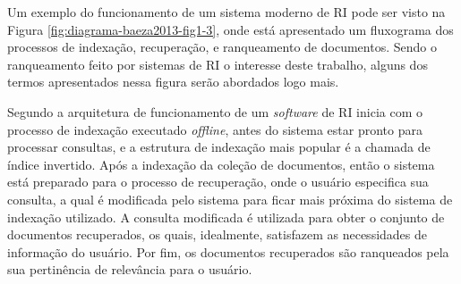     Um exemplo do funcionamento de um sistema moderno de RI pode ser visto na Figura \ref{fig:diagrama-baeza2013-fig1-3}, onde está apresentado um fluxograma dos processos de indexação, recuperação, e ranqueamento de documentos. 
    Sendo o ranqueamento feito por sistemas de RI o interesse deste trabalho, alguns dos termos apresentados nessa figura serão abordados logo mais.
    
    
    
    Segundo  a arquitetura de funcionamento de um \textit{software} de RI inicia com o processo de indexação executado \textit{offline}, antes do sistema estar pronto para processar consultas, e a estrutura de indexação mais popular é a chamada de índice invertido.
    Após a indexação da coleção de documentos, então o sistema está preparado para o processo de recuperação, onde o usuário especifica sua consulta, a qual é modificada pelo sistema para ficar mais próxima do sistema de indexação utilizado.
    A consulta modificada é utilizada para obter o conjunto de documentos recuperados, os quais, idealmente, satisfazem as necessidades de informação do usuário.
    Por fim, os documentos recuperados são ranqueados pela sua pertinência de relevância para o usuário.
    
    
    
    


